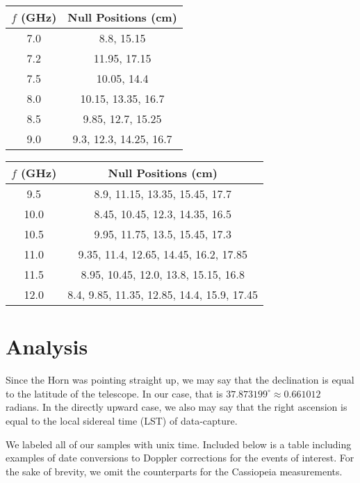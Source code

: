 \documentclass[12pt]{article}
\begin{document}
\begin{center}
 \begin{tabular}{||c c||} 
 \hline
 $f$ (GHz) & Null Positions (cm)\\ [0.5ex] 
 \hline
 7.0 & 8.8, 15.15 \\ 
 \hline
 7.2 & 11.95, 17.15 \\
 \hline
 7.5 & 10.05, 14.4 \\ 
 \hline
 8.0 & 10.15, 13.35, 16.7 \\
 \hline
 8.5 & 9.85, 12.7, 15.25 \\
 \hline 
 9.0 & 9.3, 12.3, 14.25, 16.7 \\ [1ex] 
 \hline
\end{tabular}
 \begin{tabular}{||c c||} 
 \hline
 $f$ (GHz) & Null Positions (cm)\\ [0.5ex] 
 \hline
 9.5 & 8.9, 11.15, 13.35, 15.45, 17.7 \\ 
 \hline
 10.0 & 8.45, 10.45, 12.3, 14.35, 16.5 \\
 \hline
 10.5 & 9.95, 11.75, 13.5, 15.45, 17.3 \\
 \hline
 11.0 & 9.35, 11.4, 12.65, 14.45, 16.2, 17.85 \\
 \hline
 11.5 & 8.95, 10.45, 12.0, 13.8, 15.15, 16.8 \\
 \hline
 12.0 & 8.4, 9.85, 11.35, 12.85, 14.4, 15.9, 17.45 \\ [1ex] 
 \hline
\end{tabular}
\end{center}

\section{Analysis}

\quad \quad Since the Horn was pointing straight up, we may say that the declination is equal to the latitude of the telescope. In our case, that is $37.873199^\circ \approx 0.661012$ radians. In the directly upward case, we also may say that the right ascension is equal to the local sidereal time (LST) of data-capture. %

We labeled all of our samples with unix time. Included below is a table including examples of date conversions to Doppler corrections for the events of interest. For the sake of brevity, we omit the counterparts for the Cassiopeia measurements.
\end{document}
